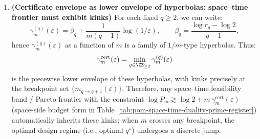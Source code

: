 \begin{remark}
\begin{enumerate}
  \[
  \boxed{\ \gamma_\infty=\log(r_2/2)=0.2155928379\ldots\ }.
  \]
  This limit is strictly less than the worst fiber endpoint exponent $\log\sqrt{\varphi}$ (equivalent to $\lim_{q\to\infty}\beta_q$, see Remark~\ref{rem:pom-betaq-isa}), indicating that the quantile certificate indeed escapes the worst-case scaling in the fixed failure rate regime; the gap is the explicit constant $\log\sqrt{\varphi}-\log(r_2/2)$.
  \item \textbf{(Certificate envelope as lower envelope of hyperbolas: space–time frontier must exhibit kinks)}
  For each fixed $q\ge 2$, we can write:
  \[
  \gamma^{(q)}_m(\varepsilon)=\beta_q+\frac{1}{m(q-1)}\log(1/\varepsilon),
  \qquad
  \beta_q=\frac{\log r_q-\log 2}{q-1},
  \]
  hence $\gamma^{(q)}_m(\varepsilon)$ as a function of $m$ is a family of $1/m$-type hyperbolas. Thus:
  \[
  \gamma^{\mathrm{cert}}_m(\varepsilon)=\min_{q\in\ZZ_{\ge 2}}\gamma^{(q)}_m(\varepsilon)
  \]
  is the piecewise lower envelope of these hyperbolas, with kinks precisely at the breakpoint set $\{m_{q\to q+1}(\varepsilon)\}$.
  Therefore, any space–time feasibility band / Pareto frontier with the constraint
  \(
  \log P_m\gtrsim \log 2+m\,\gamma^{\mathrm{cert}}_m(\varepsilon)
  \)
  (space-side budget form in Table~\ref{tab:pom-space-time-duality-prime-register}) automatically inherits these kinks: when $m$ crosses any breakpoint, the optimal design regime (i.e., optimal $q^\star$) undergoes a discrete jump.
\end{enumerate}
\end{remark}



